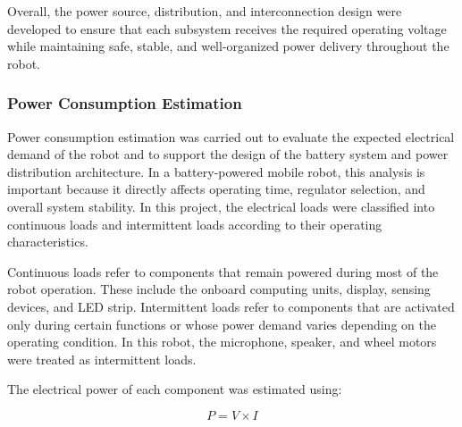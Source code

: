 Overall, the power source, distribution, and interconnection design were developed to ensure that each subsystem receives the required operating voltage while maintaining safe, stable, and well-organized power delivery throughout the robot.

\subsubsection{Power Consumption Estimation}
Power consumption estimation was carried out to evaluate the expected electrical demand of the robot and to support the design of the battery system and power distribution architecture. In a battery-powered mobile robot, this analysis is important because it directly affects operating time, regulator selection, and overall system stability. In this project, the electrical loads were classified into continuous loads and intermittent loads according to their operating characteristics.

Continuous loads refer to components that remain powered during most of the robot operation. These include the onboard computing units, display, sensing devices, and LED strip. Intermittent loads refer to components that are activated only during certain functions or whose power demand varies depending on the operating condition. In this robot, the microphone, speaker, and wheel motors were treated as intermittent loads.

The electrical power of each component was estimated using:

\begin{equation*}
    P = V \times I
\end{equation*}


